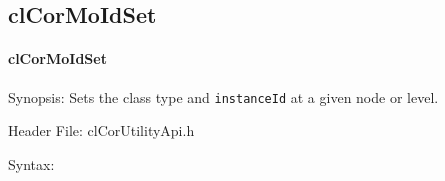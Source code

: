 \begin{flushleft}
\subsection{clCorMoIdSet}
\hypertarget{pagecor116}{}\paragraph{cl\-Cor\-MoId\-Set}\label{pagecor116}
\begin{Desc}
\item[Synopsis:]Sets the class type and {\tt{instanceId}} at a given node or level.\end{Desc}
\begin{Desc}
\item[Header File:]clCorUtilityApi.h\end{Desc}
\begin{Desc}
\item[Syntax:]


\end{Desc}
\end{flushleft}
